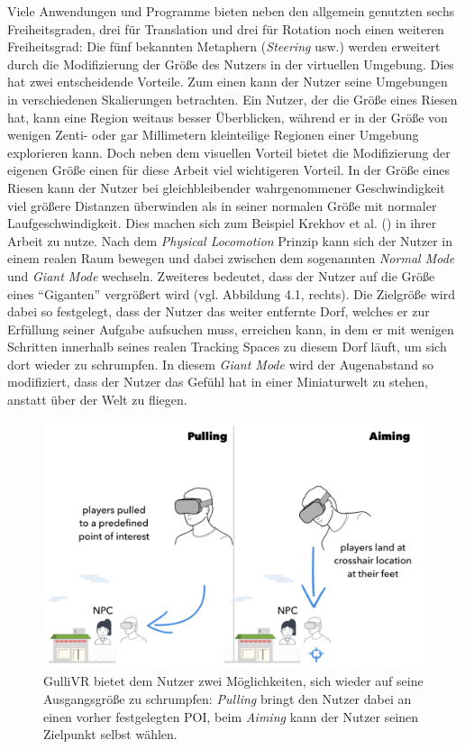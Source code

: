 Viele Anwendungen und Programme bieten neben den allgemein genutzten sechs Freiheitsgraden, drei für Translation und drei für Rotation noch einen weiteren Freiheitsgrad:
Die fünf bekannten Metaphern (\textit{Steering} usw.) werden erweitert durch die Modifizierung der Größe des Nutzers in der virtuellen Umgebung. Dies hat zwei entscheidende Vorteile. Zum einen kann der Nutzer seine Umgebungen in verschiedenen Skalierungen betrachten. Ein Nutzer, der die Größe eines Riesen hat, kann eine Region weitaus besser Überblicken, während er in der Größe von wenigen Zenti- oder gar Millimetern kleinteilige Regionen einer Umgebung explorieren kann. Doch neben dem visuellen Vorteil bietet die Modifizierung der eigenen Größe einen für diese Arbeit viel wichtigeren Vorteil. In der Größe eines Riesen kann der Nutzer bei gleichbleibender wahrgenommener Geschwindigkeit viel größere Distanzen überwinden als in seiner normalen Größe mit normaler Laufgeschwindigkeit.
Dies machen sich zum Beispiel Krekhov et al. (\cite{Krekhov2018GulliVR}) in ihrer Arbeit zu nutze. Nach dem \textit{Physical Locomotion} Prinzip kann sich der Nutzer in einem realen Raum bewegen und dabei zwischen dem sogenannten \textit{Normal Mode} und \textit{Giant Mode} wechseln. Zweiteres bedeutet, dass der Nutzer auf die Größe eines “Giganten” vergrößert wird (vgl. Abbildung 4.1, rechts). Die Zielgröße wird dabei so festgelegt, dass der Nutzer das weiter entfernte Dorf, welches er zur Erfüllung seiner Aufgabe aufsuchen muss, erreichen kann, in dem er mit wenigen Schritten innerhalb seines realen Tracking Spaces zu diesem Dorf läuft, um sich dort wieder zu schrumpfen. In diesem \textit{Giant Mode} wird der Augenabstand so modifiziert, dass der Nutzer das Gefühl hat in einer Miniaturwelt zu stehen, anstatt über der Welt zu fliegen. 

\begin{figure}[h]
  \centering
  \includegraphics[width=\textwidth]{images/pulling_aiming.png}
  \caption{GulliVR bietet dem Nutzer zwei Möglichkeiten, sich wieder auf seine Ausgangsgröße zu schrumpfen: \textit{Pulling} bringt den Nutzer dabei an einen vorher festgelegten POI, beim \textit{Aiming} kann der Nutzer seinen Zielpunkt selbst wählen. \cite{Krekhov2018GulliVR}}
  \label{fig:todo}
\end{figure}


